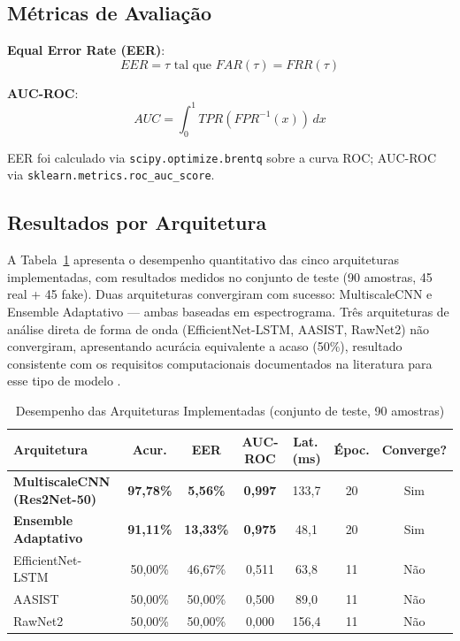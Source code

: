 \documentclass[12pt,a4paper]{article}
\begin{document}
\subsection{M\'{e}tricas de Avalia\c{c}\~{a}o}

\textbf{Equal Error Rate (EER)}:
\begin{equation}
EER = \tau \text{ tal que } FAR(\tau) = FRR(\tau)
\end{equation}

\textbf{AUC-ROC}:
\begin{equation}
AUC = \int_0^1 TPR(FPR^{-1}(x))\,dx
\end{equation}

EER foi calculado via \texttt{scipy.optimize.brentq} sobre a curva ROC;
AUC-ROC via \texttt{sklearn.metrics.roc\_auc\_score}.

\subsection{Resultados por Arquitetura}

A Tabela~\ref{tab:resultados} apresenta o desempenho quantitativo das cinco
arquiteturas implementadas, com resultados medidos no conjunto de teste
(90 amostras, 45 real + 45 fake).
Duas arquiteturas convergiram com sucesso: MultiscaleCNN e Ensemble
Adaptativo --- ambas baseadas em espectrograma.
Tr\^{e}s arquiteturas de an\'{a}lise direta de forma de onda
(EfficientNet-LSTM, AASIST, RawNet2) n\~{a}o convergiram, apresentando
acur\'{a}cia equivalente a acaso (50\%), resultado consistente com os
requisitos computacionais documentados na literatura para esse tipo de
modelo \cite{tak2021rawnet2, jung2022aasist}.

\begin{table}[H]
\centering
\caption{Desempenho das Arquiteturas Implementadas (conjunto de teste,
90 amostras)}
\label{tab:resultados}
\small
\begin{tabular}{lcccccc}
\toprule
\textbf{Arquitetura} & \textbf{Acur.} & \textbf{EER} &
\textbf{AUC-ROC} & \textbf{Lat.\,(ms)} & \textbf{\'{E}poc.} &
\textbf{Converge?} \\
\midrule
\textbf{MultiscaleCNN (Res2Net-50)}
  & \textbf{97,78\%} & \textbf{5,56\%} & \textbf{0,997}
  & 133,7 & 20 & \textcolor{successgreen}{Sim} \\
\textbf{Ensemble Adaptativo}
  & \textbf{91,11\%} & \textbf{13,33\%} & \textbf{0,975}
  & 48,1 & 20 & \textcolor{successgreen}{Sim} \\
EfficientNet-LSTM
  & 50,00\% & 46,67\% & 0,511
  & 63,8 & 11 & \textcolor{dangerred}{N\~{a}o} \\
AASIST
  & 50,00\% & 50,00\% & 0,500
  & 89,0 & 11 & \textcolor{dangerred}{N\~{a}o} \\
RawNet2
  & 50,00\% & 50,00\% & 0,000
  & 156,4 & 11 & \textcolor{dangerred}{N\~{a}o} \\
\bottomrule
\end{tabular}
\end{table}
\end{document}
